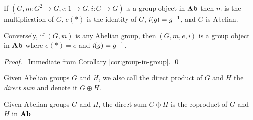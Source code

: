 \begin{prop}
If $(G, m : G^2 \rightarrow G, e : 1 \rightarrow G, i : G \rightarrow G)$ is a group object in $\mathbf{Ab}$ then $m$ is the multiplication of $G$, $e(*)$ is the identity of $G$, $i(g) = {g}^{-1}$, and $G$ is Abelian.

Conversely, if $(G, m)$ is any Abelian group, then $(G,m,e,i)$ is a group object in $\mathbf{Ab}$ where $e(*) = e$ and $i(g) = {g}^{-1}$.
\end{prop}

\begin{proof}
\pf\ Immediate from Corollary \ref{cor:group-in-group}. \qed
\end{proof}

\begin{df}
    Given Abelian groups $G$ and $H$, we also call the direct product of $G$ and $H$ the \emph{direct sum} and denote it $G \oplus H$.
\end{df}

\begin{prop}
    Given Abelian groups $G$ and $H$, the direct sum $G \oplus H$ is the coproduct of $G$ and $H$ in $\mathbf{Ab}$.
\end{prop}

